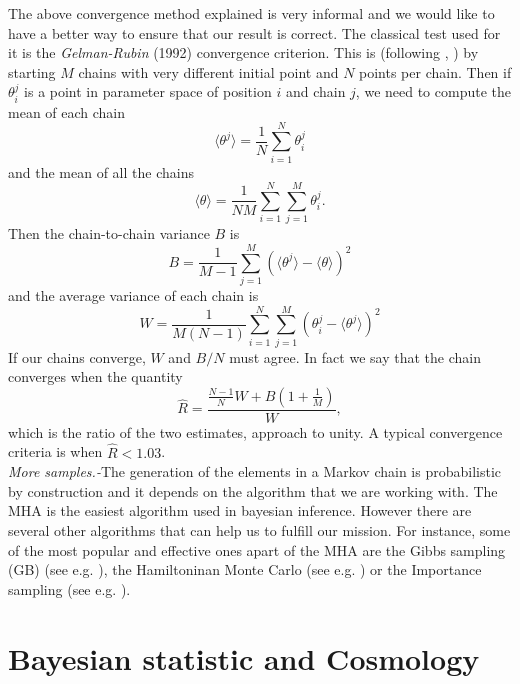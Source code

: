 \documentclass[onecolumn,           %
               showpacs,            %
               preprintnumbers,     %
               aps,                 %
               prl,          	    %
               letterpaper,             %
               superscriptaddress,      %
               nofootinbib,         %
               tightenlines,        %
               floats,floatfix      %
               ,usenatbib,
               ]{revtex4-1}
\begin{document}
The above convergence method explained is very informal and we would like to have a better way to ensure that our result is correct. The classical test used for it is the \textit{Gelman-Rubin} (1992) convergence criterion. This is (following \cite{LicV2}, \cite{AlanH}) by starting $M$ chains with very different initial point and $N$ points per chain. Then if $\theta_i^j$ is a point in parameter space of position $i$ and chain $j$, we need to compute the mean of each chain 
\begin{equation}
\langle\theta^j\rangle =\frac{1}{N}\sum_{i=1}^N \theta_i^j
\end{equation}
and the mean of all the chains
\begin{equation}
\langle\theta\rangle =\frac{1}{NM}\sum_{i=1}^N\sum_{j=1}^M\theta_i^j.
\end{equation}
Then the chain-to-chain variance $B$ is
\begin{equation}
B=\frac{1}{M-1}\sum_{j=1}^M(\langle\theta^j\rangle-\langle\theta\rangle)^2
\end{equation}
and the average variance of each chain is
\begin{equation}
W=\frac{1}{M(N-1)}\sum_{i=1}^N\sum_{j=1}^M(\theta_i^j-\langle\theta^j\rangle)^2
\end{equation}
If our chains converge, $W$ and $B/N$ must agree. In fact we say that the chain converges when the quantity
\begin{equation}
\hat R=\frac{\frac{N-1}{N}W+B(1+\frac{1}{M})}{W},
\end{equation}
which is the ratio of the two estimates, approach to unity. A typical convergence criteria is when $\hat R<1.03$. 
\\

\textit{More samples.-}The generation of the elements in a Markov chain is probabilistic by construction and it depends on the algorithm that we are working with. The MHA is the easiest algorithm used in bayesian inference. However there are several other algorithms that can help us to fulfill our mission. For instance, some of the most popular and effective ones apart of the MHA are the Gibbs sampling (GB) (see e.g. \cite{gibbs1,gibbs2}), the Hamiltoninan Monte Carlo (see e.g. \cite{hamiltonian1,Hamiltonian2}) or the Importance sampling (see e.g. \cite{importance}).

\section{Bayesian statistic and Cosmology}
\end{document}
